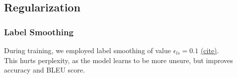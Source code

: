 \documentclass[11pt]{article}
\begin{document}
    \hypertarget{regularization}{%
\subsection{Regularization}\label{regularization}}

\hypertarget{label-smoothing}{%
\subsubsection{Label Smoothing}\label{label-smoothing}}

During training, we employed label smoothing of value
\(\epsilon_{ls}=0.1\) \href{DBLP:journals/corr/SzegedyVISW15}{(cite)}.\\
This hurts perplexity, as the model learns to be more unsure, but
improves accuracy and BLEU score.
\end{document}
